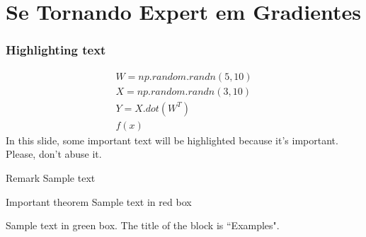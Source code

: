 \documentclass{beamer}
\begin{document}
\section{Se Tornando Expert em Gradientes}

\begin{frame}
\frametitle{Highlighting text}

\begin{gather}
	W = np.random.randn(5, 10) \\
	X = np.random.randn(3, 10) \\
	Y = X.dot(W^{T}) \\
	f(x)
\end{gather}
%
In this slide, some important text will be
\alert{highlighted} because it's important.
Please, don't abuse it.

\begin{block}{Remark}
Sample text
\end{block}

\begin{alertblock}{Important theorem}
Sample text in red box
\end{alertblock}

\begin{examples}
Sample text in green box. The title of the block is ``Examples".
\end{examples}
\end{frame}
\end{document}
